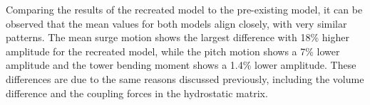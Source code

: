 \documentclass[a4paper, 11pt]{article}
\begin{document}
Comparing the results of the recreated model to the pre-existing model, it can be observed that the mean values for both models align closely, with very similar patterns. The mean surge motion shows the largest difference with 18\% higher amplitude for the recreated model, while the pitch motion shows a 7\% lower amplitude and the tower bending moment shows a 1.4\% lower amplitude. These differences are due to the same reasons discussed previously, including the volume difference and the coupling forces in the hydrostatic matrix. 
\end{document}
